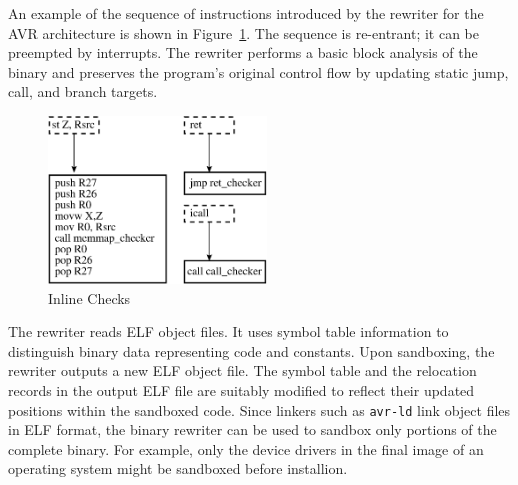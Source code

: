 An example of the sequence of instructions introduced by the rewriter for
the AVR architecture is shown in Figure~\ref{fig:inlinechecks}.
%
The sequence is re-entrant; it can be preempted by interrupts.
%
%
%
The rewriter performs a basic block analysis of the binary and preserves
the program's original control flow by updating static jump, call, and
branch targets.

\begin{figure}[htbp]
   \centering
   \includegraphics[height=1.75in, keepaspectratio=true]{figures/rewriter.eps} 
   \caption{Inline Checks}
   \label{fig:inlinechecks}
\end{figure}
%

The rewriter reads ELF object files.
%
It uses symbol table information to
distinguish binary data representing code and constants.
%
Upon sandboxing, the rewriter outputs a new ELF object file.
%
The symbol table and the relocation records in the output ELF file are
suitably modified to reflect their updated positions within the
sandboxed code.
%
Since linkers such as \texttt{avr-ld} link object files in ELF format,
%
the binary rewriter can be used to sandbox only portions
of the complete binary.
%
For example, only the device drivers in the final image of an
operating system might be sandboxed before installion.
%

%
%
